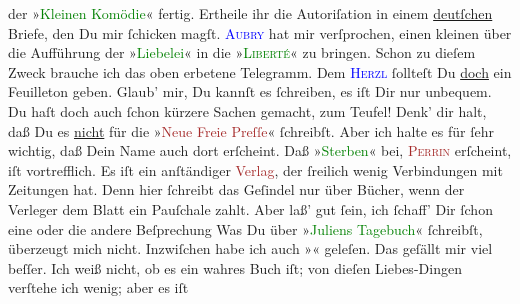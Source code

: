                der {\pb}»\textcolor{green}{Kleinen
                  Komödie}{}\ledrightnote{\textcolor{green}{Die kleine Komödie}}« fertig. Ertheile ihr die Autoriſation in einem \uline{deutſchen} Briefe, den Du mir ſchicken magſt. \textsc{\textcolor{blue}{Aubry}{}\ledrightnote{\textcolor{blue}{Georges Aubry}}} hat mir verſprochen, einen kleinen \label{K_L02750-4v}\label{K_L02750-4h} über die Aufführung der »\textcolor{green}{Liebelei}{}\ledrightnote{\textcolor{green}{Liebelei. Schauspiel in drei Akten}}« in die »\textsc{\textcolor{green}{Liberté}{}\ledrightnote{\textcolor{green}{La Liberté}}}« zu bringen. Schon zu dieſem Zweck brauche ich das oben erbetene Telegramm. Dem
                  \textsc{\textcolor{blue}{Herzl}{}\ledrightnote{\textcolor{blue}{Theodor Herzl}}} ſollteſt Du \uline{doch} ein Feuilleton geben. Glaub’
               mir, Du kannſt es ſchreiben, es iſt Dir nur unbequem. {\pb}Du haſt doch auch ſchon kürzere Sachen gemacht, zum
               Teufel! Denk’ dir halt, daß Du es \uline{nicht} für die »\textcolor{brown}{Neue Freie Preſſe}{}\ledrightnote{\textcolor{brown}{Neue Freie Presse}}« ſchreibſt. Aber ich halte es
               für ſehr wichtig, daß Dein Name auch dort erſcheint. Daß »\textcolor{green}{Sterben}{}« bei, \textsc{\textcolor{brown}{Perrin}{}\ledrightnote{\textcolor{brown}{Éditions Perrin}}} erſcheint, iſt vortrefflich. Es iſt ein anſtändiger \textcolor{brown}{Verlag}{}, der ſreilich wenig Verbindungen mit
               Zeitungen hat. Denn hier ſchreibt das Geſindel nur über {\pb}Bücher, wenn der Verleger dem Blatt ein Pauſchale
               zahlt. Aber laß’ gut ſein, ich  ſchaff’ Dir
               ſchon eine oder die andere Beſprechung{\dotssix}\pend
           \pstart
           Was Du über »\textcolor{green}{Juliens Tagebuch}{}\ledrightnote{\textcolor{green}{Julies Tagebuch. Roman}}« ſchreibſt,
               überzeugt mich nicht. Inzwiſchen habe ich auch »\label{K_L02750-88v}\label{K_L02750-88h}« geleſen. Das geſällt mir viel beſſer. Ich weiß nicht, ob es  ein wahres Buch iſt; von dieſen Liebes-Dingen verſtehe ich wenig; aber es iſt
